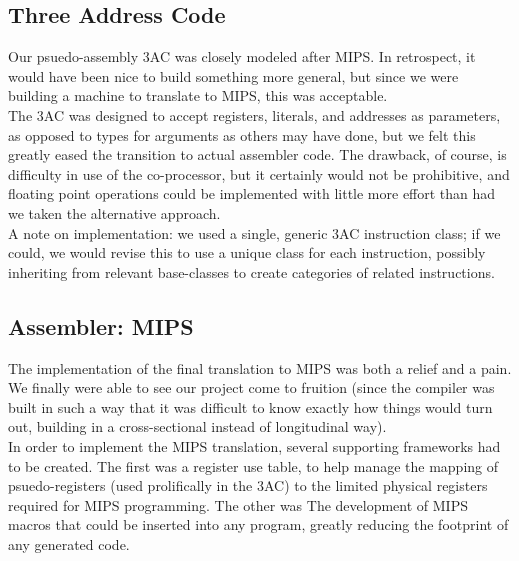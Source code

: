 \documentclass{article}
\begin{document}
\subsection{Three Address Code}
\noindent Our psuedo-assembly 3AC was closely modeled after MIPS. In retrospect, it 
would have been nice to build something more general, but since we were 
building a machine to translate to MIPS, this was acceptable.\\

\noindent The 3AC was designed to accept registers, literals, and addresses as parameters,
as opposed to types for arguments as others may have done, but we felt this
greatly eased the transition to actual assembler code. The drawback, of course,
is difficulty in use of the co-processor, but it certainly would not be
prohibitive, and floating point operations could be implemented with little
more effort than had we taken the alternative approach.\\

A note on implementation: we used a single, generic 3AC instruction class; if we
could, we would revise this to use a unique class for each instruction, possibly
inheriting from relevant base-classes to create categories of related
instructions.

\subsection{Assembler: MIPS}
\noindent The implementation of the final translation to MIPS was both a relief and a
pain. We finally were able to see our project come to fruition (since the
compiler was built in such a way that it was difficult to know exactly how
things would turn out, building in a cross-sectional instead of longitudinal
way).\\

\noindent In order to implement the MIPS translation, several supporting frameworks had
to be created. The first was a register use table, to help manage the mapping
of psuedo-registers (used prolifically in the 3AC) to the limited physical
registers required for MIPS programming. The other was The development of
MIPS macros that could be inserted into any program, greatly reducing the
footprint of any generated code.\\
\end{document}
